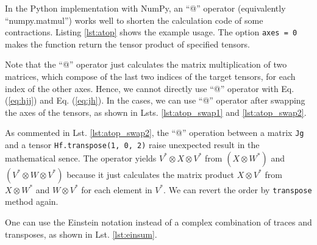 \documentclass[a4paper]{article}
\begin{document}
In the Python implementation with NumPy, an ``@'' operator (equivalently ``numpy.matmul'') works well
to shorten the calculation code of some contractions.
Listing \ref{lst:atop} shows the example usage.
The option \texttt{axes = 0} makes the function return the tensor product of specified tensors.
\begin{center}
    
\end{center}
Note that the ``@'' operator just calculates the matrix multiplication of two matrices,
which compose of the last two indices of the target tensors, for each index of the other axes.
Hence, we cannot directly use ``@'' operator with Eq. (\ref{eq:hjj}) and Eq. (\ref{eq:jh}).
In the cases, we can use ``@'' operator after swapping the axes of the tensors,
as shown in Lsts. \ref{lst:atop_swap1} and \ref{lst:atop_swap2}.
\begin{center}
    
\end{center}
As commented in Lst. \ref{lst:atop_swap2},
the ``@'' operation between a matrix \texttt{Jg} and a tensor \texttt{Hf.transpose(1, 0, 2)} raise unexpected result
in the mathematical sence.
The operator yields $V^* \otimes X \otimes V^*$ from $(X\otimes W^*)$ and $(V^* \otimes W \otimes V^*)$
because it just calculates the matrix product $X \otimes V^*$ from
$X\otimes W^*$ and $W\otimes V^*$ for each element in $V^*$.
We can revert the order by \texttt{transpose} method again.
\begin{center}
    
\end{center}
One can use the Einstein notation instead of a complex combination of traces and transposes,
as shown in Lst. \ref{lst:einsum}.
\begin{center}
    
\end{center}
\end{document}
